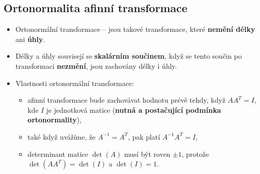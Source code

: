 \subsection{Ortonormalita afinní transformace}
\begin{itemize}
    \item Ortonormální transformace -- jsou takové transformace, které \textbf{nemění délky} ani \textbf{úhly}.
    \item Délky a úhly souvisejí se \textbf{skalárním součinem}, když se tento součin po transformaci \textbf{nezmění}, jsou zachovány délky i úhly.
    \item Vlastnosti ortonormální transformace:
          \begin{itemize}
              \item afinní transformace bude zachovávat hodnotu prévě tehdy, když $AA^T=I$, kde $I$ je jednotková matice (\textbf{nutná a postačující podmínka ortonormality}),
              \item také když uvážíme, že $A^{-1} = A^T$, pak platí $A^{-1} A^T = I$,
              \item determinant matice $\det(A)$ musí být roven $\pm 1$, protože $\det(AA^T) = \det(I)$ a $\det(I) = 1$.
          \end{itemize}
\end{itemize}

